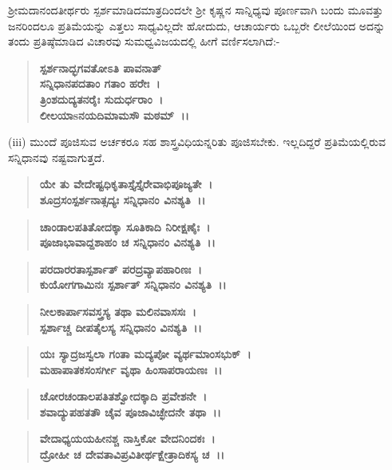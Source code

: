 ಶ‍್ರೀಮದಾನಂದತೀರ್ಥರು ಸ್ಪರ್ಶಮಾಡಿದಮಾತ್ರದಿಂದಲೇ ಶ‍್ರೀ ಕೃಷ್ಣನ ಸಾನ್ನಿಧ್ಯವು ಪೂರ್ಣವಾಗಿ ಬಂದು ಮೂವತ್ತು ಜನರಿಂದಲೂ ಪ್ರತಿಮೆಯನ್ನು ಎತ್ತಲು ಸಾಧ್ಯವಿಲ್ಲದೇ ಹೋದುದು, ಆಚಾರ್ಯರು ಒಬ್ಬರೇ ಲೀಲೆಯಿಂದ ಅದನ್ನು ತಂದು ಪ್ರತಿಷ್ಠೆಮಾಡಿದ ವಿಚಾರವು ಸುಮಧ್ವವಿಜಯದಲ್ಲಿ ಹೀಗೆ ವರ್ಣಿಸಲಾಗಿದೆ:-

\begin{verse}
\textbf{ಸ್ಪರ್ಶನಾದ್ಭಗವತೋಽತಿ ಪಾವನಾತ್}\\\textbf{ಸನ್ನಿಧಾನಪದತಾಂ ಗತಾಂ ಹರೇಃ~।}\\\textbf{ತ್ರಿಂಶದುದ್ಯತನರೈಃ ಸುದುರ್ಧರಾಂ~।}\\\textbf{ಲೀಲಯಾsನಯದಿಮಾಮಸೌ ಮಠಮ್~।।}
\end{verse}

(iii) ಮುಂದೆ ಪೂಜಿಸುವ ಅರ್ಚಕರೂ ಸಹ ಶಾಸ್ತ್ರವಿಧಿಯನ್ನರಿತು ಪೂಜಿಸಬೇಕು. ಇಲ್ಲದಿದ್ದರೆ ಪ್ರತಿಮೆಯಲ್ಲಿರುವ ಸನ್ನಿಧಾನವು ನಷ್ಟವಾಗುತ್ತದೆ.

\begin{verse}
\textbf{ಯೇ ತು ವೇದೇಷ್ಟಧಿಕೃತಾಸ್ತೈಸ್ತೈರೇವಾಭಿಪೂಜ್ಯತೇ~।}\\\textbf{ಶೂದ್ರಸಂಸ್ಪರ್ಶನಾತ್ಸದ್ಯಃ ಸನ್ನಿಧಾನಂ ವಿನಶ್ಯತಿ~।।}
\end{verse}

\begin{verse}
\textbf{ಚಾಂಡಾಲಪತಿತೋದಕ್ಕಾ ಸೂತಿಕಾದಿ ನಿರೀಕ್ಷಣೈಃ~।}\\\textbf{ಪೂಜಾಭಾವಾದ್ದಶಾಹಂ ಚ ಸನ್ನಿಧಾನಂ ವಿನಶ್ಯತಿ~।।}
\end{verse}

\begin{verse}
\textbf{ಪರದಾರರತಾಸ್ಪರ್ಶಾತ್ ಪರದ್ರವ್ಯಾಪಹಾರಿಣಃ~।}\\\textbf{ಕುಯೋಗಗಾಮಿನಃ ಸ್ಪರ್ಶಾತ್ ಸನ್ನಿಧಾನಂ ವಿನಶ್ಯತಿ~।।}
\end{verse}

\begin{verse}
\textbf{ನೀಲಕಾರ್ಪಾಸವಸ್ತ್ರಸ್ಯ ತಥಾ ಮಲಿನವಾಸಸಃ~।}\\\textbf{ಸ್ಪರ್ಶಾಚ್ಚ ದೀಪತೈಲಸ್ಯ ಸನ್ನಿಧಾನಂ ವಿನಶ್ಯತಿ~।।}
\end{verse}

\begin{verse}
\textbf{ಯಃ ಸ್ಯಾದ್ರಜಸ್ವಲಾ ಗಂತಾ ಮದ್ಯಪೋ ವ್ಯರ್ಥಮಾಂಸಭುಕ್~।}\\\textbf{ಮಹಾಪಾತಕಸಂಸರ್ಗೀ ವೃಥಾ ಹಿಂಸಾಪರಾಯಣಃ~।।}
\end{verse}

\begin{verse}
\textbf{ಚೋರಚಂಡಾಲಪತಿತಶ್ವೋದಕ್ಕಾದಿ ಪ್ರವೇಶನೇ~।}\\\textbf{ಶವಾದ್ಯುಪಹತತೌ ಚೈವ ಪೂಜಾವಿಚ್ಛೇದನೇ ತಥಾ~।।}
\end{verse}

\begin{verse}
\textbf{ವೇದಾಧ್ಯಯಯಹೀನಶ್ಚ ನಾಸ್ತಿಕೋ ವೇದನಿಂದಕಃ~।}\\\textbf{ದ್ರೋಹೀ ಚ ದೇವತಾವಿಪ್ರವಿತೀರ್ಥಕ್ಷೇತ್ರಾದಿಕಸ್ಯ ಚ~।।}
\end{verse}


